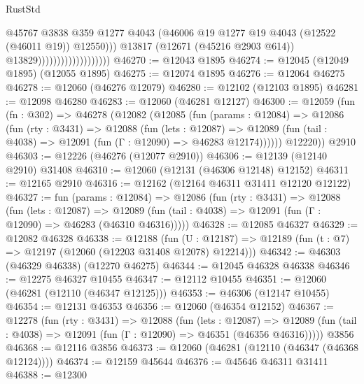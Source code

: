 \begin{lexlean}{RustStd}
\begin{coremodule}
                                              @45767
                                              @3838
                                              @359
                                              @1277
                                              @4043
                                              (@46006
                                                @19
                                                @1277
                                                @19
                                                @4043
                                                (@12522 (@46011 @19))
                                                @12550)))
                                          @13817
                                          (@12671 (@45216 @2903 @614))
                                          @13829)))))))))))))))))))
@46270 := @12043 @1895
@46274 := @12045 (@12049 @1895) (@12055 @1895)
@46275 := @12074 @1895
@46276 := @12064 @46275
@46278 := @12060 (@46276 @12079)
@46280 := @12102 (@12103 @1895)
@46281 := @12098 @46280
@46283 := @12060 (@46281 @12127)
@46300 := @12059
    (fun (fn : @302) =>
    @46278
      (@12082
        (@12085
          (fun (params : @12084) =>
          @12086
            (fun (rty : @3431) =>
            @12088
              (fun (lets : @12087) =>
              @12089 (fun (tail : @4038) => @12091 (fun (Γ : @12090) => @46283 @12174))))))
        @12220))
    @2910
@46303 := @12226 (@46276 (@12077 @2910))
@46306 := @12139 (@12140 @2910) @31408
@46310 := @12060 (@12131 (@46306 @12148) @12152)
@46311 := @12165 @2910
@46316 := @12162 (@12164 @46311 @31411 @12120 @12122)
@46327 := fun (params : @12084) =>
  @12086
    (fun (rty : @3431) =>
    @12088
      (fun (lets : @12087) =>
      @12089 (fun (tail : @4038) => @12091 (fun (Γ : @12090) => @46283 (@46310 @46316)))))
@46328 := @12085 @46327
@46329 := @12082 @46328
@46338 := @12188
    (fun (U : @12187) => @12189 (fun (t : @7) => @12197 (@12060 (@12203 @31408 @12078) @12214)))
@46342 := @46303 (@46329 @46338) (@12270 @46275)
@46344 := @12045 @46328 @46338
@46346 := @12275 @46327 @10455
@46347 := @12112 @10455
@46351 := @12060 (@46281 (@12110 (@46347 @12125)))
@46353 := @46306 (@12147 @10455)
@46354 := @12131 @46353
@46356 := @12060 (@46354 @12152)
@46367 := @12278
    (fun (rty : @3431) =>
    @12088
      (fun (lets : @12087) =>
      @12089 (fun (tail : @4038) => @12091 (fun (Γ : @12090) => @46351 (@46356 @46316)))))
    @3856
@46368 := @12116 @3856
@46373 := @12060 (@46281 (@12110 (@46347 (@46368 @12124))))
@46374 := @12159 @45644
@46376 := @45646 @46311 @31411
@46388 := @12300

\end{coremodule}
\end{lexlean}
